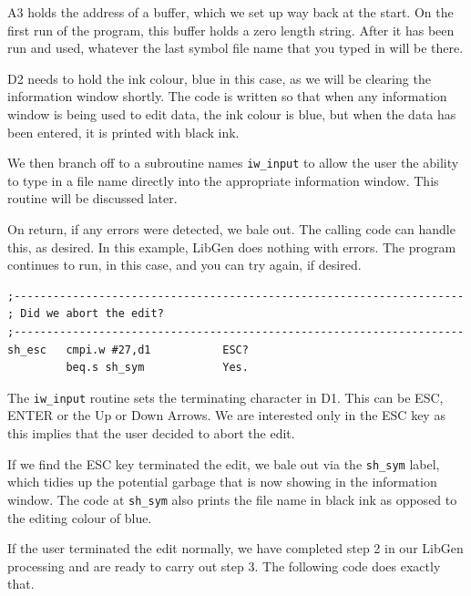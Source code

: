 A3 holds the address of a buffer, which we set up way back at the
    start. On the first run of the program, this buffer holds a zero length
    string. After it has been run and used, whatever the last symbol file name
    that you typed in will be there.

D2 needs to hold the ink colour, blue in this case, as we will be
    clearing the information window shortly. The code is written so that when
    any information window is being used to edit data, the ink colour is blue,
    but when the data has been entered, it is printed with black ink.

We then branch off to a subroutine names
 \texttt{iw\_input} to allow the user the ability to type in a
    file name directly into the appropriate information window. This routine
    will be discussed later.

On return, if any errors were detected, we bale out. The calling
    code can handle this, as desired. In this example,
 LibGen does nothing with errors. The program
    continues to run, in this case, and you can try again, if desired.

\begin{lstlisting}[firstnumber=1,]
;---------------------------------------------------------------------
; Did we abort the edit?
;---------------------------------------------------------------------
sh_esc   cmpi.w #27,d1           ESC?
         beq.s sh_sym            Yes.
\end{lstlisting}

The \texttt{iw\_input} routine sets the terminating
    character in D1. This can be ESC, ENTER or the Up or Down Arrows. We are
    interested only in the ESC key as this implies that the user decided to
    abort the edit.

If we find the ESC key terminated the edit, we bale out via the
 \texttt{sh\_sym} label, which tidies up the potential garbage
    that is now showing in the information window. The code at
 \texttt{sh\_sym} also prints the file name in black ink as
    opposed to the editing colour of blue.

If the user terminated the edit normally, we have completed step 2
    in our LibGen processing and are ready to carry
    out step 3. The following code does exactly that.

